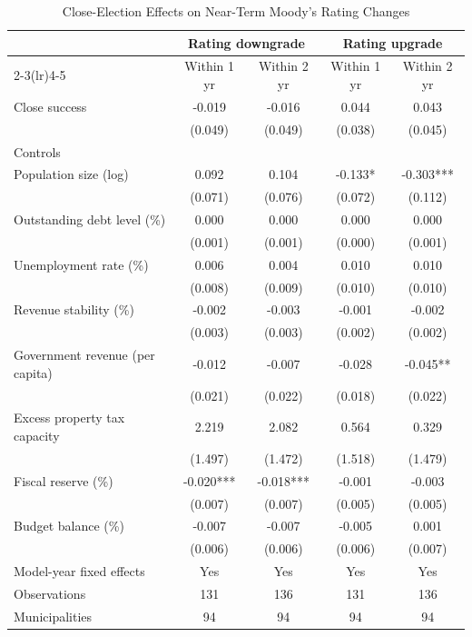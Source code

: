 \begin{table}[!htbp]
\centering
\caption{Close-Election Effects on Near-Term Moody's Rating Changes}
\label{tab:post_northeast_rdd_main}
\small
\begin{tabular}{lcccc}
\toprule
 & \multicolumn{2}{c}{Rating downgrade} & \multicolumn{2}{c}{Rating upgrade} \\
\cmidrule(lr){2-3}\cmidrule(lr){4-5}
 & Within 1 yr & Within 2 yr & Within 1 yr & Within 2 yr \\
\midrule
Close success & -0.019 & -0.016 & 0.044 & 0.043 \\
 & (0.049) & (0.049) & (0.038) & (0.045) \\
\midrule
\multicolumn{5}{l}{Controls} \\
Population size (log) & 0.092 & 0.104 & -0.133* & -0.303*** \\
 & (0.071) & (0.076) & (0.072) & (0.112) \\
Outstanding debt level (\%) & 0.000 & 0.000 & 0.000 & 0.000 \\
 & (0.001) & (0.001) & (0.000) & (0.001) \\
Unemployment rate (\%) & 0.006 & 0.004 & 0.010 & 0.010 \\
 & (0.008) & (0.009) & (0.010) & (0.010) \\
Revenue stability (\%) & -0.002 & -0.003 & -0.001 & -0.002 \\
 & (0.003) & (0.003) & (0.002) & (0.002) \\
Government revenue (per capita) & -0.012 & -0.007 & -0.028 & -0.045** \\
 & (0.021) & (0.022) & (0.018) & (0.022) \\
Excess property tax capacity & 2.219 & 2.082 & 0.564 & 0.329 \\
 & (1.497) & (1.472) & (1.518) & (1.479) \\
Fiscal reserve (\%) & -0.020*** & -0.018*** & -0.001 & -0.003 \\
 & (0.007) & (0.007) & (0.005) & (0.005) \\
Budget balance (\%) & -0.007 & -0.007 & -0.005 & 0.001 \\
 & (0.006) & (0.006) & (0.006) & (0.007) \\
\midrule
Model-year fixed effects & Yes & Yes & Yes & Yes \\
Observations & 131 & 136 & 131 & 136 \\
Municipalities & 94 & 94 & 94 & 94 \\
\bottomrule
\end{tabular}

\end{table}
